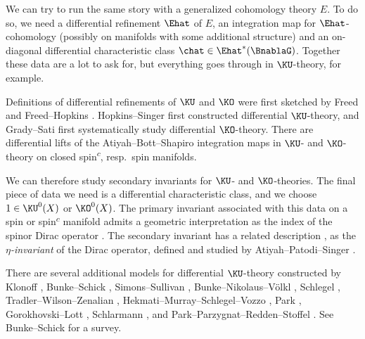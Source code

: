 \begin{remark}
We can try to run the same story with a generalized cohomology theory $E$. To do so, we need a differential
refinement $\Ehat$ of $E$, an integration map for $\Ehat$-cohomology (possibly on manifolds with some additional
structure) and an on-diagonal differential characteristic class $\chat\in \Ehat^*(\BnablaG)$. Together these data are a lot to
ask for, but everything goes through in $\KU$-theory, for example.

Definitions of differential refinements of $\KU$ and $\KO$ were first sketched by Freed \cite[Examples 1.12 and
1.13]{Fre00} and Freed--Hopkins \cite{FH00}. Hopkins--Singer \cite[\S 4.4]{HopkinsSinger} first constructed
differential $\KU$-theory, and Grady--Sati \cite{GS21} first systematically study differential
$\KO$-theory. There are differential lifts of the Atiyah--Bott--Shapiro integration maps in $\KU$- and $\KO$-theory
on closed spin\textsuperscript{$c$}, resp.\ spin manifolds.

We can therefore study secondary invariants for $\KU$- and $\KO$-theories. The final piece of data we need is a
differential characteristic class, and we choose $1\in\KU^0(X)$ or $\KO^0(X)$. The primary invariant associated
with this data on a spin or spin\textsuperscript{$c$} manifold admits a geometric interpretation as the index of
the spinor Dirac operator \cite{AS68}. The secondary invariant has a related description \cite{Lot94}, as the
\emph{$\eta$-invariant} of the Dirac operator, defined and studied by Atiyah--Patodi--Singer \cite{APS1, APS2,
APS3}.

There are several additional models for differential $\KU$-theory constructed by
Klonoff \cite{Klo08},
Bunke--Schick \cite[\S 2]{BS09},
Simons--Sullivan \cite{MR2732065},
Bunke--Nikolaus--Völkl \cite[\S 6]{MR3462099},
Schlegel \cite[\S 4.2]{Sch13},
Tradler--Wilson--Zenalian \cite{TWZ13, TWZ16},
Hekmati--Murray--Schlegel--Vozzo \cite{HMSV15},
Park \cite{Par17},
Gorokhovski--Lott \cite{GL18},
Schlarmann \cite{Sch19},
and Park--Parzygnat--Redden--Stoffel \cite{PPRS21}.
See Bunke--Schick \cite{BunksSchick} for a survey.
\end{remark}
